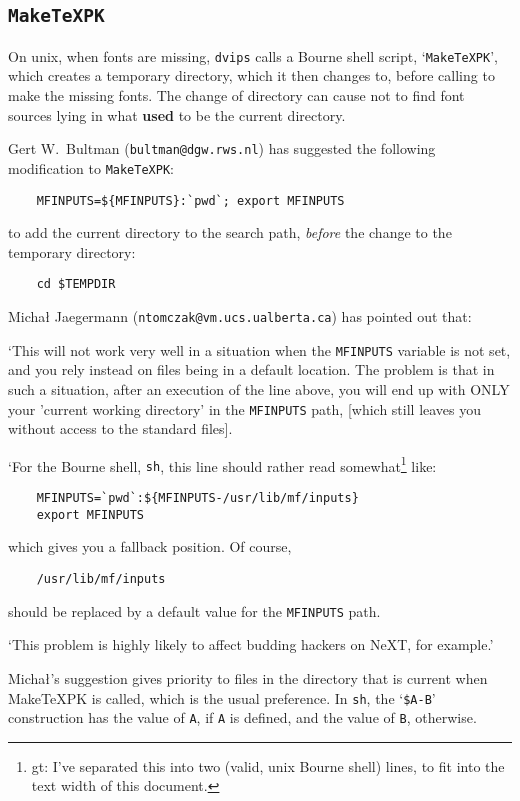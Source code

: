 \subsection{{\tt MakeTeXPK}}\label{sub:maketexpk}

On {\sc unix}, when fonts are missing,
{\tt dvips} calls a Bourne shell script, `{\tt MakeTeXPK}',
which creates a temporary directory, which it then changes to,
before calling \MF{} to make the missing fonts.
The change of directory can cause \MF{} not to find font sources
lying in what {\bf used} to be the current directory.

Gert W.~{\sc Bultman} ({\tt bultman@dgw.rws.nl}) has suggested the
following modification to {\tt MakeTeXPK\/}:
\begin{verbatim}
    MFINPUTS=${MFINPUTS}:`pwd`; export MFINPUTS
\end{verbatim}
to add the current directory to the search path, {\em before} the
change to the temporary directory:
\begin{verbatim}
    cd $TEMPDIR
\end{verbatim}

Micha{\l} {\sc Jaegermann} ({\tt ntomczak@vm.ucs.ualberta.ca})
has pointed out that:

`This will not work very well in a situation when the {\tt MFINPUTS} variable
is not set, and you rely instead on \MF{} files being in a default
location.  The problem is that in such a situation, after an execution
of the line above, you will end up with ONLY your 'current working
directory' in the {\tt MFINPUTS} path, [which still leaves you
without access to the standard \MF{} files].

`For the Bourne shell, {\tt sh}, this line should rather read
somewhat\footnote{gt:  I've separated this into two (valid, unix
Bourne shell) lines, to fit into the text width of this document.}
like:
\begin{verbatim}
    MFINPUTS=`pwd`:${MFINPUTS-/usr/lib/mf/inputs}
    export MFINPUTS
\end{verbatim}
which gives you a fallback position.  Of course,
\begin{verbatim}
    /usr/lib/mf/inputs
\end{verbatim}
should be replaced by a default value for the {\tt MFINPUTS} path.

`This problem is highly likely to affect budding \MF{} hackers
on {\sf NeXT}, for example.'

Micha{\l}'s suggestion gives priority to \MF{} files in the directory that
is current when MakeTeXPK is called, which is the usual preference.
In {\tt sh}, the `{\tt \${A-B}}' construction has the value of {\tt A},
if {\tt A} is defined, and the value of {\tt B}, otherwise.

